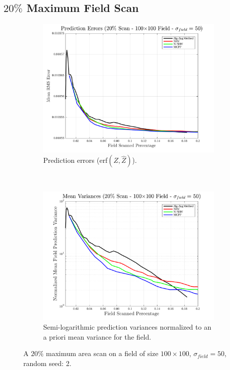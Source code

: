 \FloatBarrier
\clearpage
\subsection{$20\%$ Maximum Field Scan}
\begin{figure}[htb!]
    \centering
    \begin{subfigure}[t]{0.65\textwidth}
        \centering
        \includegraphics[width=\linewidth]{figures/hbresults/pred_errs_20p_100x100_sf_50_seed_2.png}
        \captionsetup{skip=0.20\baselineskip,size=footnotesize}
        \caption{Prediction errors (erf$(Z,\hat{Z})$).}
        \label{fig:prederrs_sigma50_p20_s2}
    \end{subfigure}%
    \\
    \begin{subfigure}[t]{0.65\textwidth}
        \centering
        \includegraphics[width=\linewidth]{figures/hbresults/vars_20p_100x100_sf_50_seed_2.png}
        \captionsetup{skip=0.20\baselineskip,size=footnotesize}
        \caption{Semi-logarithmic prediction variances normalized to an a priori mean variance for the field.}
        \label{fig:prederrs_sigma50_p20_s2}
    \end{subfigure}
    \captionsetup{skip=0.20\baselineskip}
    \caption{A $20\%$ maximum area scan on a field of size $100 \times 100$, $\sigma_{field} = 50$, random seed: 2.}
    \label{fig:sigma50_p20_s2}
\end{figure}

